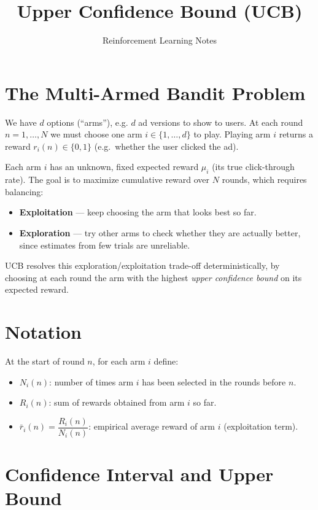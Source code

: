 \documentclass[11pt]{article}
\title{Upper Confidence Bound (UCB)}
\author{Reinforcement Learning Notes}
\date{}
\begin{document}
\maketitle

\section{The Multi-Armed Bandit Problem}

We have $d$ options (``arms''), e.g. $d$ ad versions to show to users. At each
round $n = 1, \dots, N$ we must choose one arm $i \in \{1, \dots, d\}$ to
play. Playing arm $i$ returns a reward $r_i(n) \in \{0, 1\}$ (e.g.\ whether
the user clicked the ad).

Each arm $i$ has an unknown, fixed expected reward $\mu_i$ (its true
click-through rate). The goal is to maximize cumulative reward over $N$
rounds, which requires balancing:

\begin{itemize}
  \item \textbf{Exploitation} --- keep choosing the arm that looks best so far.
  \item \textbf{Exploration} --- try other arms to check whether they are
        actually better, since estimates from few trials are unreliable.
\end{itemize}

UCB resolves this exploration/exploitation trade-off deterministically, by
choosing at each round the arm with the highest \emph{upper confidence
bound} on its expected reward.

\section{Notation}

At the start of round $n$, for each arm $i$ define:

\begin{itemize}
  \item $N_i(n)$: number of times arm $i$ has been selected in the rounds
        before $n$.
  \item $R_i(n)$: sum of rewards obtained from arm $i$ so far.
  \item $\bar{r}_i(n) = \dfrac{R_i(n)}{N_i(n)}$: empirical average reward
        of arm $i$ (exploitation term).
\end{itemize}

\section{Confidence Interval and Upper Bound}
\end{document}
